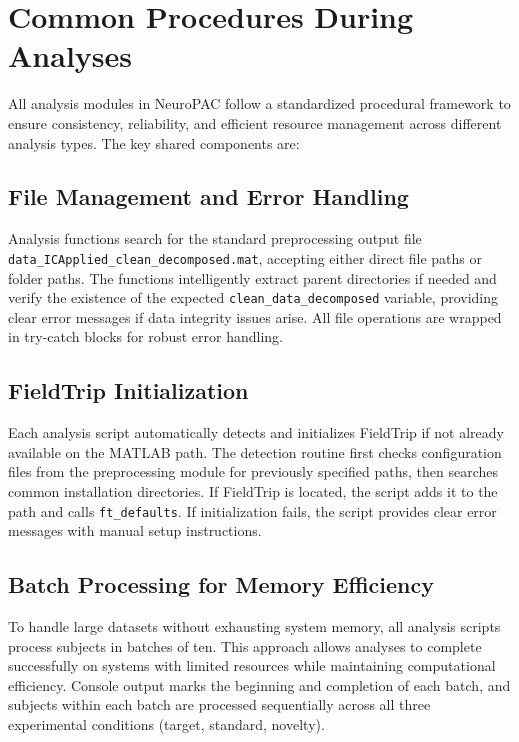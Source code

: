 \documentclass[12pt]{report}
\begin{document}
\section{Common Procedures During Analyses}

All analysis modules in NeuroPAC follow a standardized procedural framework to ensure consistency, reliability, and efficient resource management across different analysis types. The key shared components are:

\subsection{File Management and Error Handling}

Analysis functions search for the standard preprocessing output file \verb|data_ICApplied_clean_decomposed.mat|, accepting either direct file paths or folder paths. The functions intelligently extract parent directories if needed and verify the existence of the expected \verb|clean_data_decomposed| variable, providing clear error messages if data integrity issues arise. All file operations are wrapped in try-catch blocks for robust error handling.

\subsection{FieldTrip Initialization}

Each analysis script automatically detects and initializes FieldTrip if not already available on the MATLAB path. The detection routine first checks configuration files from the preprocessing module for previously specified paths, then searches common installation directories. If FieldTrip is located, the script adds it to the path and calls \verb|ft_defaults|. If initialization fails, the script provides clear error messages with manual setup instructions.

\subsection{Batch Processing for Memory Efficiency}

To handle large datasets without exhausting system memory, all analysis scripts process subjects in batches of ten. This approach allows analyses to complete successfully on systems with limited resources while maintaining computational efficiency. Console output marks the beginning and completion of each batch, and subjects within each batch are processed sequentially across all three experimental conditions (target, standard, novelty).
\end{document}
